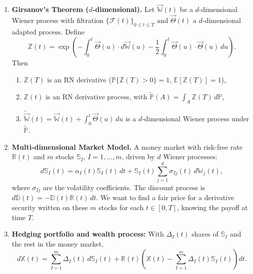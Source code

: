 \begin{enumerate}
    \item \textbf{Girsanov's Theorem ($d$-dimensional).} Let $\vec{\mathbb{W}}(t)$ be a $d$-dimensional Wiener process with filtration $\{\mathcal{F}(t)\}_{0 \leq t \leq T}$ and $\vec{\Theta}(t)$ a $d$-dimensional adapted process. Define
    \[\mathbb{Z}(t) = \exp\!\left(-\int_0^t\vec{\Theta}(u)\cdot d\vec{\mathbb{W}}(u) - \frac{1}{2}\int_0^t\vec{\Theta}(u)\cdot\vec{\Theta}(u)\, du\right).\]
    Then
    \begin{enumerate}
        \item $\mathbb{Z}(T)$ is an RN derivative ($\mathbb{P}\{\mathbb{Z}(T) > 0\} = 1$, $\mathbb{E}[\mathbb{Z}(T)] = 1$),
        \item $\mathbb{Z}(t)$ is an RN derivative process, with $\tilde{\mathbb{P}}(A) = \int_A\mathbb{Z}(T)\, d\mathbb{P}$,
        \item $\tilde{\vec{\mathbb{W}}}(t) = \vec{\mathbb{W}}(t) + \int_0^t\vec{\Theta}(u)\, du$ is a $d$-dimensional Wiener process under $\tilde{\mathbb{P}}$.
    \end{enumerate}

    \item \textbf{Multi-dimensional Market Model.} A money market with risk-free rate $\mathbb{R}(t)$ and $m$ stocks $\mathbb{S}_I$, $I = 1, \dots, m$, driven by $d$ Wiener processes:
    \[d\mathbb{S}_I(t) = \alpha_I(t)\mathbb{S}_I(t)\, dt + \mathbb{S}_I(t)\sum_{j=1}^{d}\sigma_{Ij}(t)\, d\mathbb{W}_j(t),\]
    where $\sigma_{Ij}$ are the volatility coefficients. The discount process is $d\mathbb{D}(t) = -\mathbb{D}(t)\mathbb{R}(t)\, dt$. We want to find a fair price for a derivative security written on these $m$ stocks for each $t \in [0, T]$, knowing the payoff at time $T$.

    \item \textbf{Hedging portfolio and wealth process:} With $\Delta_I(t)$ shares of $\mathbb{S}_I$ and the rest in the money market,
    \[d\mathbb{X}(t) = \sum_{I=1}^{m}\Delta_I(t)\, d\mathbb{S}_I(t) + \mathbb{R}(t)\left(\mathbb{X}(t) - \sum_{I=1}^{m}\Delta_I(t)\mathbb{S}_I(t)\right)dt.\]


\end{enumerate}
